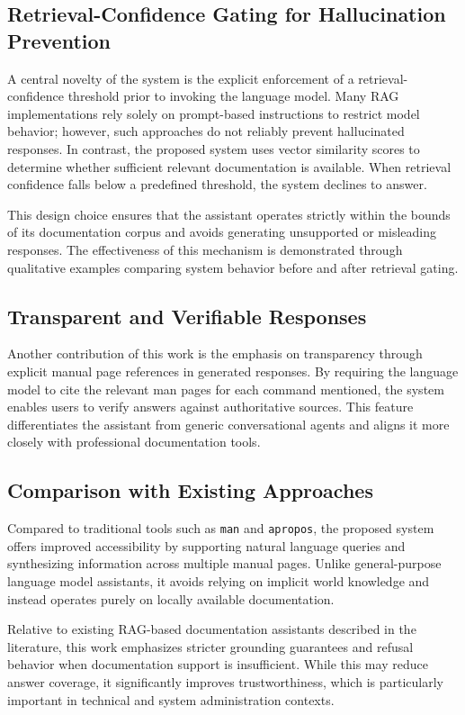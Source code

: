 \documentclass[conference]{IEEEtran}
\begin{document}
\subsection{Retrieval-Confidence Gating for Hallucination Prevention}

A central novelty of the system is the explicit enforcement of a retrieval-confidence threshold prior to invoking the language model. Many RAG implementations rely solely on prompt-based instructions to restrict model behavior; however, such approaches do not reliably prevent hallucinated responses. In contrast, the proposed system uses vector similarity scores to determine whether sufficient relevant documentation is available. When retrieval confidence falls below a predefined threshold, the system declines to answer.

This design choice ensures that the assistant operates strictly within the bounds of its documentation corpus and avoids generating unsupported or misleading responses. The effectiveness of this mechanism is demonstrated through qualitative examples comparing system behavior before and after retrieval gating.

\subsection{Transparent and Verifiable Responses}

Another contribution of this work is the emphasis on transparency through explicit manual page references in generated responses. By requiring the language model to cite the relevant man pages for each command mentioned, the system enables users to verify answers against authoritative sources. This feature differentiates the assistant from generic conversational agents and aligns it more closely with professional documentation tools.

\subsection{Comparison with Existing Approaches}

Compared to traditional tools such as \texttt{man} and \texttt{apropos}, the proposed system offers improved accessibility by supporting natural language queries and synthesizing information across multiple manual pages. Unlike general-purpose language model assistants, it avoids relying on implicit world knowledge and instead operates purely on locally available documentation.

Relative to existing RAG-based documentation assistants described in the literature, this work emphasizes stricter grounding guarantees and refusal behavior when documentation support is insufficient. While this may reduce answer coverage, it significantly improves trustworthiness, which is particularly important in technical and system administration contexts.
\end{document}
